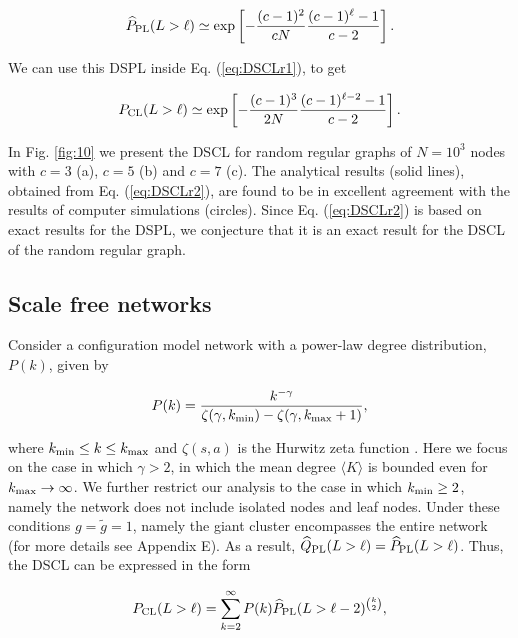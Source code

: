 \documentclass[preprint,pre,superscriptaddress,showpacs]{revtex4}
\begin{document}
\begin{equation}
\widehat P_{\rm PL}(L>\ell) \simeq 
\exp \left[ -\frac{(c-1)^2}{cN} \frac{(c-1)^{\ell}-1}{c-2} \right].
\end{equation}

\noindent
We can use this DSPL inside Eq. (\ref{eq:DSCLr1}), to get

\begin{equation}
P_{\rm CL}(L>\ell) \simeq 
\exp \left[ -\frac{(c-1)^3}{2N} \frac{(c-1)^{\ell-2}-1}{c-2} \right].
\label{eq:DSCLr2}
\end{equation}

\noindent
In Fig. \ref{fig:10} we present the
DSCL for random regular graphs of $N=10^{3}$ nodes with $c=3$ (a),
$c=5$ (b) and $c=7$ (c).
The analytical results (solid lines),
obtained from Eq. (\ref{eq:DSCLr2}),
are found to be 
in excellent agreement with the results of 
computer simulations (circles).
Since Eq. (\ref{eq:DSCLr2}) is based on exact results for the 
DSPL, we conjecture that it is an exact result for the DSCL of the
random regular graph.


\subsection{Scale free networks}

Consider a configuration model network with a power-law degree distribution, $P(k)$,
given by 

\begin{equation}
P(k) = \frac{ k^{-\gamma} }{ \zeta(\gamma,k_{\rm min}) 
- \zeta(\gamma,k_{\rm max}+1) },
\label{eq:PLnorm}
\end{equation}

\noindent
where 
$k_{\rm min} \le k \le k_{\rm max}$
and
$\zeta(s,a)$ is the Hurwitz zeta function 
\cite{Olver2010}.
Here we focus on the case in which $\gamma > 2$, in which the
mean degree $\langle K \rangle$ is bounded even for 
$k_{\rm max} \rightarrow \infty$.
We further restrict our analysis to the case in which $k_{\rm min} \ge 2$,
namely the network does not include isolated nodes and leaf nodes.
Under these conditions 
$g = \tilde g = 1$, namely the giant cluster encompasses the entire network
(for more details see Appendix E).
As a result, $\widehat Q_{\rm PL}(L>\ell) = \widehat P_{\rm PL}(L>\ell)$.
Thus, the DSCL can be expressed in the form

\begin{equation}
P_{\rm CL}(L > \ell) = \sum_{k=2}^{\infty} 
P(k) \widehat P_{\rm PL}(L>\ell-2)^{\binom{k}{2}},
\end{equation}
\end{document}
